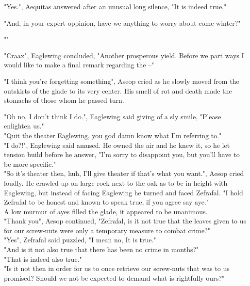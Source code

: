 \documentclass[smalldemyvopaper,11pt,twoside,onecolumn,openright,extrafontsizes]{memoir}
\begin{document}
"Yes.", Aequitas answered after an unusual long silence, "It is indeed true."

"And, in your expert oppinion, have we anything to worry about come winter?"

""

"Craax", Eaglewing concluded, "Another prosperous yield. Before we part ways I would like to make a final remark regarding the --"

"I think you're forgetting something", Aseop cried as he slowly moved from the outskirts of the glade to its very center. His smell of rot and death made the stomachs of those whom he passed turn. 

"Oh no, I don't think I do.", Eaglewing said giving of a sly smile, "Please enlighten us."\\

"Quit the theater Eaglewing, you god damn know what I'm referring to."\\

"I do?!", Eaglewing said amused. He owned the air and he knew it, so he let tension build before he answer, "I'm sorry to disappoint you, but you'll have to be more specific."\\

"So it's theater then, huh, I'll give theater if that's what you want.", Aesop cried loudly. He crawled up on large rock next to the oak as to be in height with Eaglewing, but instead of facing Eaglewing he turned and faced Zefrafal. "I hold Zefrafal to be honest and known to speak true, if you agree say aye."\\

A low murmur of ayes filled the glade, it appeared to be unanimous.\\

"Thank you", Aesop continued, "Zefrafal, is it not true that the leaves given to us for our screw-nuts were only a temporary measure to combat crime?"\\

"Yes", Zefrafal said puzzled, "I mean no, It is true."\\

"And is it not also true that there has been no crime in months?"\\

"That is indeed also true."\\

"Is it not then in order for us to once retrieve our screw-nuts that was to us promised? Should we not be expected to demand what is rightfully ours?"\\
\end{document}
